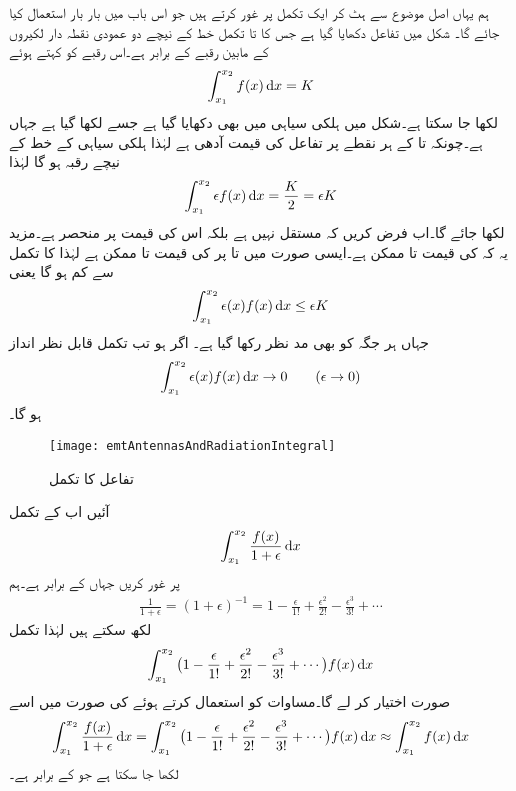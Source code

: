 ہم یہاں اصل موضوع سے ہٹ کر ایک تکمل پر غور کرتے ہیں جو اس باب میں بار بار استعمال کیا جائے گا۔
شکل  میں تفاعل  دکھایا گیا ہے جس کا  تا  تکمل خط کے نیچے دو عمودی نقطہ دار لکیروں کے مابین رقبے کے برابر ہے۔اس رقبے کو  کہتے ہوئے
\begin{align}
\int_{x_1}^{x_2} f(x) \dif x =K
\end{align}
لکھا جا سکتا ہے۔شکل میں ہلکی سیاہی میں  بھی دکھایا گیا ہے جسے  لکھا گیا ہے جہاں  ہے۔چونکہ   تا  کے ہر نقطے پر تفاعل کی قیمت آدھی ہے لہٰذا ہلکی سیاہی کے خط کے نیچے رقبہ  ہو گا لہٰذا
\begin{align}
\int_{x_1}^{x_2} \epsilon f(x) \dif x =\frac{K}{2}=\epsilon K
\end{align}
لکھا جائے گا۔اب فرض کریں کہ  مستقل نہیں ہے بلکہ اس کی قیمت  پر منحصر ہے۔مزید یہ کہ  کی قیمت  تا  ممکن ہے۔ایسی صورت میں  تا  پر  کی قیمت  تا  ممکن ہے لہٰذا  کا تکمل   سے  کم ہو گا یعنی
\begin{align}
\int_{x_1}^{x_2} \epsilon(x) f(x) \dif x  \le \epsilon  K
\end{align}
جہاں ہر جگہ  کو بھی مد نظر رکھا گیا ہے۔ اگر  ہو تب تکمل قابل نظر انداز
\begin{align}\label{مساوات_اینٹینا_تکمل_صفر}
\int_{x_1}^{x_2} \epsilon(x) f(x) \dif x  \to 0 \quad \quad (\epsilon \to 0)
\end{align}
 ہو گا۔
\begin{figure}
\centering
\texttt{[image: emtAntennasAndRadiationIntegral]}
\caption{تفاعل کا تکمل}
\label{شکل_اینٹینا_تفاعل_کا_تکمل}
\end{figure}

آئیں اب  کے تکمل
\begin{align}
\int_{x_1}^{x_2} \frac{f(x)}{1+\epsilon} \dif x
\end{align}
 پر غور کریں جہاں  کے برابر ہے۔ہم
\begin{align}
\frac{1}{1+\epsilon}=(1+\epsilon)^{-1}=1-\frac{\epsilon}{1!}+\frac{\epsilon^2}{2!}-\frac{\epsilon^3}{3!}+\cdots
\end{align}
لکھ سکتے ہیں لہٰذا تکمل
\begin{align}
\int_{x_1}^{x_2} \big(1-\frac{\epsilon}{1!}+\frac{\epsilon^2}{2!}-\frac{\epsilon^3}{3!}+\cdots \big) f(x) \dif x
\end{align}
صورت اختیار کر لے گا۔مساوات  کو استعمال کرتے ہوئے  کی صورت میں اسے
\begin{align}\label{مساوات_اینٹینا_تکمل_رقبہ}
\int_{x_1}^{x_2} \frac{f(x)}{1+\epsilon} \dif x=\int_{x_1}^{x_2} \big(1-\frac{\epsilon}{1!}+\frac{\epsilon^2}{2!}-\frac{\epsilon^3}{3!}+\cdots \big) f(x) \dif x \approx \int_{x_1}^{x_2} f(x) \dif x
\end{align}
لکھا جا سکتا ہے جو  کے برابر ہے۔

